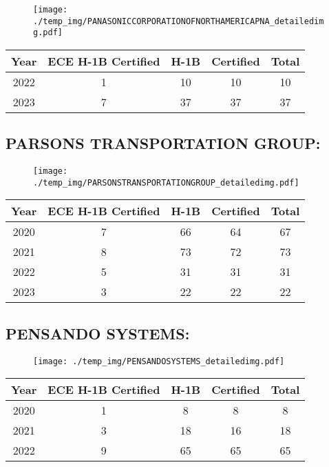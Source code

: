 \documentclass{article}%
\begin{document}
\begin{figure}[htbp]%
\centering%
\texttt{[image: ./temp\_img/PANASONICCORPORATIONOFNORTHAMERICAPNA\_detailedimg.pdf]}%
\end{figure}

%
\begin{longtable}{c|c|c|c|c}%
\hline%
Year&ECE H{-}1B Certified&H{-}1B&Certified&Total\\%
\hline%
2022&1&10&10&10\\%
\hline%
2023&7&37&37&37\\%
\hline%
\end{longtable}

%
\newpage%
\subsection{PARSONS TRANSPORTATION GROUP:}%
\label{subsec:PARSONSTRANSPORTATIONGROUP}%
\label{PARSONSTRANSPORTATIONGROUPdetailed}%


\begin{figure}[htbp]%
\centering%
\texttt{[image: ./temp\_img/PARSONSTRANSPORTATIONGROUP\_detailedimg.pdf]}%
\end{figure}

%
\begin{longtable}{c|c|c|c|c}%
\hline%
Year&ECE H{-}1B Certified&H{-}1B&Certified&Total\\%
\hline%
2020&7&66&64&67\\%
\hline%
2021&8&73&72&73\\%
\hline%
2022&5&31&31&31\\%
\hline%
2023&3&22&22&22\\%
\hline%
\end{longtable}

%
\newpage%
\subsection{PENSANDO SYSTEMS:}%
\label{subsec:PENSANDOSYSTEMS}%
\label{PENSANDOSYSTEMSdetailed}%


\begin{figure}[htbp]%
\centering%
\texttt{[image: ./temp\_img/PENSANDOSYSTEMS\_detailedimg.pdf]}%
\end{figure}

%
\begin{longtable}{c|c|c|c|c}%
\hline%
Year&ECE H{-}1B Certified&H{-}1B&Certified&Total\\%
\hline%
2020&1&8&8&8\\%
\hline%
2021&3&18&16&18\\%
\hline%
2022&9&65&65&65\\%
\hline%
\end{longtable}
\end{document}
